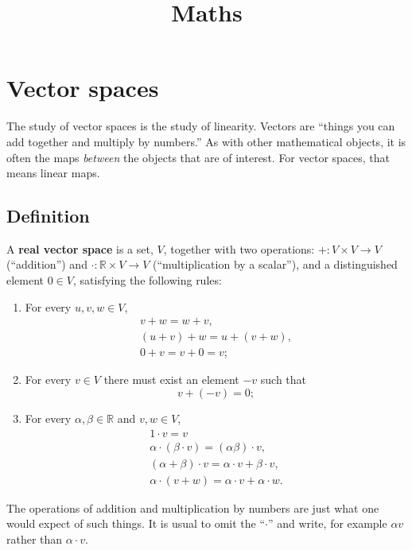 \documentclass[10pt, a4paper, twocolumn]{article}
\title{Maths}
\newcommand{\R}{\mathbb{R}}
\newcommand{\defn}[1]{\textbf{#1}}
\begin{document}
\maketitle

\section{Vector spaces}
The study of vector spaces is the study of linearity. Vectors are “things you
can add together and multiply by numbers.” As with other mathematical objects,
it is often the maps \emph{between} the objects that are of interest. For vector
spaces, that means linear maps.

\subsection{Definition}
A \defn{real vector space} is a set, $V$, together with two operations: ${+}:V \times
V \to V$ (“addition”) and ${\cdot}:\R \times V \to V$ (“multiplication by a scalar”), and a
distinguished element $ 0\in V$, satisfying the following rules:
\begin{enumerate}
\item
  For every $u, v, w \in V$,
  \begin{equation*}
    \begin{gathered}
      v + w = w + v, \\
      (u + v) + w = u + (v + w), \\
      0 + v = v + 0 = v;
      \end{gathered}
  \end{equation*}
\item For every $v \in V$ there must exist an element $-v$ such that
  \begin{equation*}
    v + (-v) = 0; 
  \end{equation*}
\item For every $\alpha, \beta \in \R$ and $v, w \in V$,
  \begin{equation*}
    \begin{gathered}
      1 \cdot v = v \\
      \alpha \cdot (\beta \cdot v) = (\alpha \beta) \cdot v, \\
      (\alpha + \beta) \cdot v = \alpha \cdot v + \beta \cdot v, \\
      \alpha \cdot (v + w) = \alpha \cdot v + \alpha \cdot w.
    \end{gathered}
  \end{equation*}
\end{enumerate}
The operations of addition and multiplication by numbers are just what one would
expect of such things. It is usual to omit the “$\cdot$” and write, for example $\alpha
v$ rather than $\alpha \cdot v$.
\end{document}
